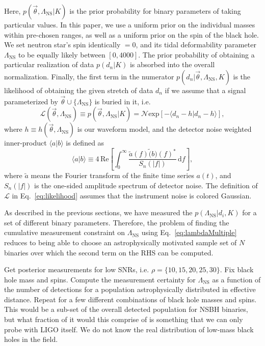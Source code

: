 \documentclass[aps,prd,amsmath,floats,floatfix, twocolumn,
superscriptaddress,nofootinbib,showpacs]{revtex4-1}
\newcommand{\prayush}{\textcolor{red!40!black}}
\newcommand{\D}{\mathrm{d}}
\newcommand{\lambdans}{\Lambda_\mathrm{NS}}
\newcommand{\LL}{\mathcal{L}}
\begin{document}
Here, $p(\vec{\theta}, \lambdans | K)$ is the prior probability for binary parameters of taking 
particular values. In this paper, we use a uniform prior on the individual masses within 
pre-chosen ranges, as well as a uniform prior on the spin of the black hole. We set neutron star's
spin identically $=0$, and its tidal deformability parameter $\lambdans$ to be equally likely
between $[0, 4000]$. The prior probability of obtaining a particular realization of data
$p(d_n|K)$ is absorbed into the overall normalization. Finally, the first term in the numerator
$p(d_n|\vec{\theta}, \lambdans, K)$ is the likelihood of obtaining the given stretch of 
data $d_n$ if we assume that a signal parameterized by $\vec{\theta}\cup\{\lambdans\}$ is buried
in it, i.e.
\begin{equation}\label{eq:likelihood}
 \LL(\vec{\theta}, \lambdans) \equiv p(\vec{\theta}, \lambdans | K) = \mathcal{N} \mathrm{exp}[- \langle d_n - h | d_n - h\rangle ],
\end{equation}
where $h\equiv h(\vec{\theta}, \lambdans)$ is our waveform model, and the detector noise
weighted inner-product $\langle a|b\rangle$ is defined as 
$$
\langle a|b\rangle \equiv 4\,\mathrm{Re}\left[\int_0^\infty \dfrac{\tilde{a}(f) \tilde(b)(f)^*}{S_n(|f|)}\,\D f\right],
$$
where $\tilde{a}$ means the Fourier transform of the finite time series $a(t)$, and 
$S_n(|f|)$ is the one-sided amplitude spectrum of detector noise. The definition of $\LL$ in 
Eq.~\ref{eq:likelihood} assumes that the instrument noise is colored Gaussian. 


\prayush{%
As described in the previous sections, we have measured the $p(\lambdans | d_i, K)$ for a 
set of different binary parameters. Therefore, the problem of finding the cumulative measurement
constraint on $\lambdans$ using Eq.~\ref{eq:lambdaMultiple} reduces to being able to choose
an astrophysically motivated sample set of $N$ binaries over which the second term on the RHS 
can be computed.}

\prayush{%
Get posterior measurements for low SNRs, i.e. $\rho=\{10, 15, 20, 25, 30\}$. 
Fix black hole mass and spins. Compute the measurement certainty for $\lambdans$
as a function of the number of detections for a population astrophysically distributed 
in effective distance. Repeat for a few different combinations of black hole masses
and spins. This would be a sub-set of the overall detected population for NSBH binaries,
but what fraction of it would this comprise of is something that we can only probe with
LIGO itself. We do not know the real distribution of low-mass black holes in the field.
}
\end{document}
